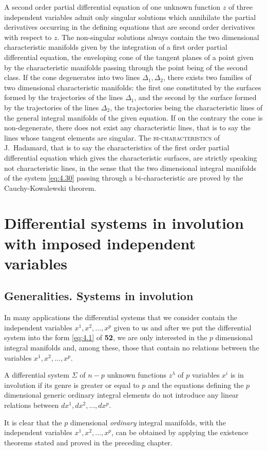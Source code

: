 \begin{thm*}
  A second order partial differential equation of one unknown function $z$ of three independent variables admit only singular solutions which annihilate the partial derivatives occurring in the defining equations that are second order derivatives with respect to $z$. The non-singular solutions always contain the  two dimensional characteristic manifolds given by the integration of a first order partial differential equation, the enveloping cone of the tangent planes of a point given by the characteristic manifolds passing through the point being of the second class. If the cone degenerates into two lines $\Delta_{1},\Delta_{2}$, there exists two families of two dimensional characteristic manifolds: the first one constituted by the surfaces formed by the trajectories of the lines $\Delta_{1}$, and the second by the surface formed by the trajectories of the lines $\Delta_{2}$, the trajectories being the characteristic lines of the general integral manifolds of the given equation. If on the contrary the cone is non-degenerate, there does not exist any characteristic lines, that is to say the lines whose tangent elements are singular. The \textsc{bi-characteristics} of J.~Hadamard, that is to say the characteristics of the first order partial differential equation which gives the characteristic surfaces, are strictly speaking not characteristic lines, in the sense that the two dimensional integral manifolds of the system \eqref{eq:4.30} passing through a bi-characteristic are proved by the Cauchy-Kowalewski theorem.
\end{thm*}

\chapter{Differential systems in involution with imposed independent variables}
\label{cha:diff-syst-invol}

\section{Generalities. Systems in involution}
\label{sec:gener-syst-invol}

\fsec In many applications the differential systems that we consider contain the independent variables $x^{1},x^{2},\dots,x^{p}$ given to us and after we put the differential system into the form \eqref{eq:4.1} of \textsection\textbf{52}, we are only interested in the $p$ dimensional integral manifolds and, among these, those that contain no relations between the variables $x^{1},x^{2},\dots,x^{p}$.
\begin{dfn*}
  A differential system $\Sigma$ of $n-p$ unknown functions $z^{\lambda}$ of $p$ variables $x^{i}$ is in involution if its genre is greater or equal to $p$ and  the equations defining the $p$ dimensional generic ordinary integral elements do not introduce any linear relations between $dx^{1},dx^{2},\dots,dx^{p}$.
\end{dfn*}
It is clear that the $p$ dimensional \emph{ordinary} integral manifolds, with the independent variables $x^{1},x^{2},\dots,x^{p}$, can be obtained by applying the existence theorems stated and proved in the preceding chapter. 

